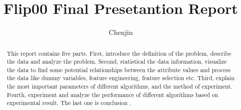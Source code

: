 \documentclass{amsart}
\begin{document}
%
%
\title[Lin's Flip00 ]{Flip00 Final Presetantion Report}%

\author{Chenjin}
\address[A.~1]{School of Computer Science,\\ 
HuNan University, , China}%




%
\date{\gitAuthorDate}%

\begin{abstract}
This report contains five parts. 
First, 
introduce the definition of the problem,
describe the data and analyze the problem. 
Second, 
statistical the data information, 
visualize the data to find some potential relationships 
between the attribute values 
and process the data 
like dummy variables, feature engineering, feature selection etc. 
Third, 
explain the most important parameters 
of different algorithms,
and the method of experiment.
Fourth,
experiment and 
analyze the performance of different algorithms
based on experimental result.
The last one is conclusion . 
\end{abstract}

\maketitle
\tableofcontents

\newpage






\newpage



\listoftodos
\end{document}
